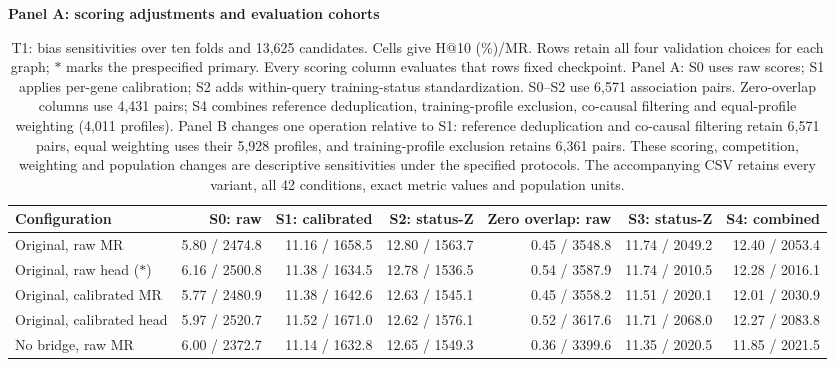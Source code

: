 \begin{landscape}
\begin{table}[p]
\centering\footnotesize
\setlength{\tabcolsep}{3pt}
\caption{T1: bias sensitivities over ten folds and 13,625 candidates. Cells give H@10 (\%)/MR. Rows retain all four validation choices for each graph; $\ast$ marks the prespecified primary. Every scoring column evaluates that row\textquotesingle s fixed checkpoint. Panel A: S0 uses raw scores; S1 applies per-gene calibration; S2 adds within-query training-status standardization. S0--S2 use 6,571 association pairs. Zero-overlap columns use 4,431 pairs; S4 combines reference deduplication, training-profile exclusion, co-causal filtering and equal-profile weighting (4,011 profiles). Panel B changes one operation relative to S1: reference deduplication and co-causal filtering retain 6,571 pairs, equal weighting uses their 5,928 profiles, and training-profile exclusion retains 6,361 pairs. These scoring, competition, weighting and population changes are descriptive sensitivities under the specified protocols. The accompanying CSV retains every variant, all 42 conditions, exact metric values and population units.}
\label{tab:matched_bias_T1}
\textbf{Panel A: scoring adjustments and evaluation cohorts}\par\smallskip
\begin{adjustbox}{max width=\linewidth}
\begin{tabular}{lrrrrrr}
\toprule
Configuration & S0: raw & S1: calibrated & S2: status-Z & Zero overlap: raw & S3: status-Z & S4: combined \\
\midrule
Original, raw MR & 5.80 / 2474.8 & 11.16 / 1658.5 & 12.80 / 1563.7 & 0.45 / 3548.8 & 11.74 / 2049.2 & 12.40 / 2053.4 \\
Original, raw head ($\ast$) & 6.16 / 2500.8 & 11.38 / 1634.5 & 12.78 / 1536.5 & 0.54 / 3587.9 & 11.74 / 2010.5 & 12.28 / 2016.1 \\
Original, calibrated MR & 5.77 / 2480.9 & 11.38 / 1642.6 & 12.63 / 1545.1 & 0.45 / 3558.2 & 11.51 / 2020.1 & 12.01 / 2030.9 \\
Original, calibrated head & 5.97 / 2520.7 & 11.52 / 1671.0 & 12.62 / 1576.1 & 0.52 / 3617.6 & 11.71 / 2068.0 & 12.27 / 2083.8 \\
No bridge, raw MR & 6.00 / 2372.7 & 11.14 / 1632.8 & 12.65 / 1549.3 & 0.36 / 3399.6 & 11.35 / 2020.5 & 11.85 / 2021.5 \\

\end{tabular}
\end{adjustbox}
\end{table}
\end{landscape}
